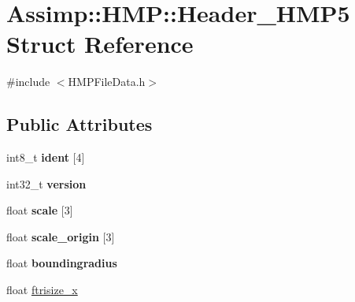 \hypertarget{struct_assimp_1_1_h_m_p_1_1_header___h_m_p5}{\section{Assimp\+:\+:H\+M\+P\+:\+:Header\+\_\+\+H\+M\+P5 Struct Reference}
\label{struct_assimp_1_1_h_m_p_1_1_header___h_m_p5}
}


{\ttfamily \#include $<$H\+M\+P\+File\+Data.\+h$>$}

\subsection*{Public Attributes}
\begin{DoxyCompactItemize}
\item 
\hypertarget{struct_assimp_1_1_h_m_p_1_1_header___h_m_p5_a34ab70b0c7d8ecb8d7d63281d5eb6ef4}{int8\+\_\+t {\bfseries ident} \mbox{[}4\mbox{]}}\label{struct_assimp_1_1_h_m_p_1_1_header___h_m_p5_a34ab70b0c7d8ecb8d7d63281d5eb6ef4}

\item 
\hypertarget{struct_assimp_1_1_h_m_p_1_1_header___h_m_p5_a4dd15bcf4973ab39114feb9aa6ccc422}{int32\+\_\+t {\bfseries version}}\label{struct_assimp_1_1_h_m_p_1_1_header___h_m_p5_a4dd15bcf4973ab39114feb9aa6ccc422}

\item 
\hypertarget{struct_assimp_1_1_h_m_p_1_1_header___h_m_p5_a097eec9005f32c574ba07d085092c43c}{float {\bfseries scale} \mbox{[}3\mbox{]}}\label{struct_assimp_1_1_h_m_p_1_1_header___h_m_p5_a097eec9005f32c574ba07d085092c43c}

\item 
\hypertarget{struct_assimp_1_1_h_m_p_1_1_header___h_m_p5_a444dd0d890e67471d8fc49e208098fec}{float {\bfseries scale\+\_\+origin} \mbox{[}3\mbox{]}}\label{struct_assimp_1_1_h_m_p_1_1_header___h_m_p5_a444dd0d890e67471d8fc49e208098fec}

\item 
\hypertarget{struct_assimp_1_1_h_m_p_1_1_header___h_m_p5_a8791014dfac6619bab201e2e3a639012}{float {\bfseries boundingradius}}\label{struct_assimp_1_1_h_m_p_1_1_header___h_m_p5_a8791014dfac6619bab201e2e3a639012}

\item 
\hypertarget{struct_assimp_1_1_h_m_p_1_1_header___h_m_p5_abc44b96813b44e67a87f2116b042ef5d}{float \hyperlink{struct_assimp_1_1_h_m_p_1_1_header___h_m_p5_abc44b96813b44e67a87f2116b042ef5d}{ftrisize\+\_\+x}}\label{struct_assimp_1_1_h_m_p_1_1_header___h_m_p5_abc44b96813b44e67a87f2116b042ef5d}


\end{DoxyCompactItemize}
